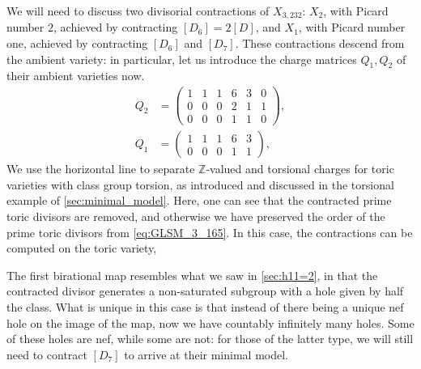 \documentclass[11pt,dvipsnames]{article}
\theoremstyle{definition}
\begin{document}
We will need to discuss two divisorial contractions of $X_{3,232}$: $X_2$, with Picard number $2$, achieved by contracting $[D_6] = 2[D]$, and $X_1$, with Picard number one, achieved by contracting $[D_6]$ and $[D_7]$. These contractions descend from the ambient variety: in particular, let us introduce the charge matrices $Q_1, Q_2$ of their ambient varieties now.
\begin{align}
    Q_2 &= \left(\begin{array}{cccccc}
        1 & 1 & 1 & 6 & 3 & 0 \\ 0 & 0 & 0 & 2 & 1 & 1 \\ \hline 0 & 0 & 0 & 1 & 1 & 0
    \end{array}\right), \\
    Q_1 &= \left(\begin{array}{cccccc}
        1 & 1 & 1 & 6 & 3 \\ \hline 0 & 0 & 0 & 1 & 1
    \end{array}\right), 
\end{align}
We use the horizontal line to separate $\mathbb{Z}$-valued and torsional charges for toric varieties with class group torsion, as introduced and discussed in the torsional example of \cref{sec:minimal_model}. Here, one can see that the contracted prime toric divisors are removed, and otherwise we have preserved the order of the prime toric divisors from \cref{eq:GLSM_3_165}. In this case, the contractions can be computed on the toric variety, 

The first birational map resembles what we saw in \cref{sec:h11=2}, in that the contracted divisor generates a non-saturated subgroup with a hole given by half the class. What is unique in this case is that instead of there being a unique nef hole on the image of the map, now we have countably infinitely many holes. Some of these holes are nef, while some are not: for those of the latter type, we will still need to contract $[D_7]$ to arrive at their minimal model.
\end{document}
